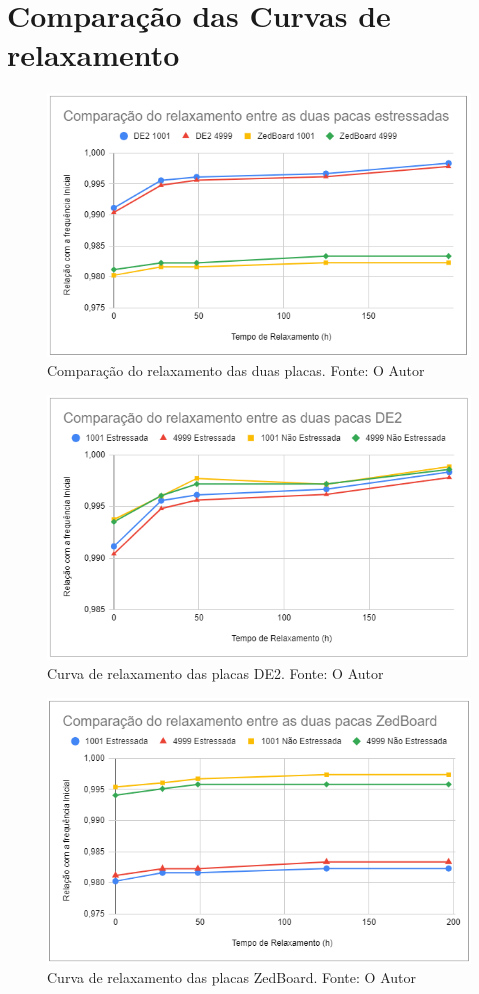 \section{Comparação das Curvas de relaxamento}

\begin{figure}[H]
    \centering
    \includegraphics[scale=0.75]{figures/Resultados/RelaxEstressadas}
    \caption{Comparação do relaxamento das duas placas. Fonte: O Autor}
    \label{fig:RelaxEstressadas}
\end{figure}

\begin{figure}[H]
    \centering
    \includegraphics[scale=0.75]{figures/Resultados/RelaxDE2}
    \caption{Curva de relaxamento das placas DE2. Fonte: O Autor}
    \label{fig:RelaxDE2}
\end{figure}

\begin{figure}[H]
    \centering
    \includegraphics[scale=0.75]{figures/Resultados/RelaxZedBoard}
    \caption{Curva de relaxamento das placas ZedBoard. Fonte: O Autor}
    \label{fig:RelaxZedBoard}
\end{figure}